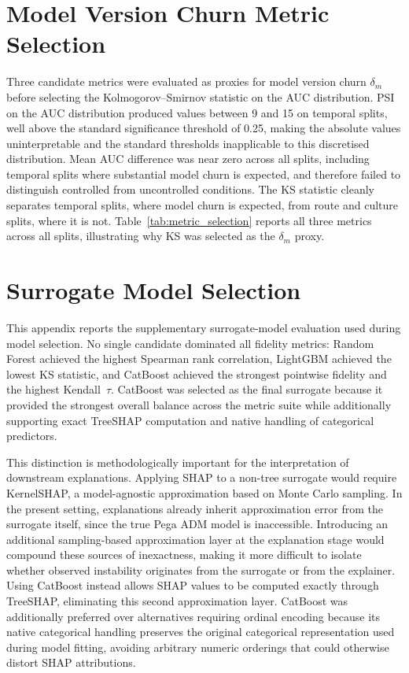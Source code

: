 \documentclass[oneside]{memoir} %
\begin{document}


\section{Model Version Churn Metric Selection} \label{app:metric_selection}

Three candidate metrics were evaluated as proxies for model version churn $\delta_m$ before selecting the Kolmogorov--Smirnov statistic on the AUC distribution. PSI on the AUC distribution produced values between 9 and 15 on temporal splits, well above the standard significance threshold of 0.25, making the absolute values uninterpretable and the standard thresholds inapplicable to this discretised distribution. Mean AUC difference was near zero across all splits, including temporal splits where substantial model churn is expected, and therefore failed to distinguish controlled from uncontrolled conditions. The KS statistic cleanly separates temporal splits, where model churn is expected, from route and culture splits, where it is not. Table~\ref{tab:metric_selection} reports all three metrics across all splits, illustrating why KS was selected as the $\delta_m$ proxy.



\section{Surrogate Model Selection} \label{app:surrogate_model_selection}

This appendix reports the supplementary surrogate-model evaluation used during model selection. No single candidate dominated all fidelity metrics: Random Forest achieved the highest Spearman rank correlation, LightGBM achieved the lowest KS statistic, and CatBoost achieved the strongest pointwise fidelity and the highest Kendall~$\tau$. CatBoost was selected as the final surrogate because it provided the strongest overall balance across the metric suite while additionally supporting exact TreeSHAP computation and native handling of categorical predictors.

This distinction is methodologically important for the interpretation of downstream explanations. Applying SHAP to a non-tree surrogate would require KernelSHAP, a model-agnostic approximation based on Monte Carlo sampling. In the present setting, explanations already inherit approximation error from the surrogate itself, since the true Pega ADM model is inaccessible. Introducing an additional sampling-based approximation layer at the explanation stage would compound these sources of inexactness, making it more difficult to isolate whether observed instability originates from the surrogate or from the explainer. Using CatBoost instead allows SHAP values to be computed exactly through TreeSHAP, eliminating this second approximation layer. CatBoost was additionally preferred over alternatives requiring ordinal encoding because its native categorical handling preserves the original categorical representation used during model fitting, avoiding arbitrary numeric orderings that could otherwise distort SHAP attributions.
\end{document}
